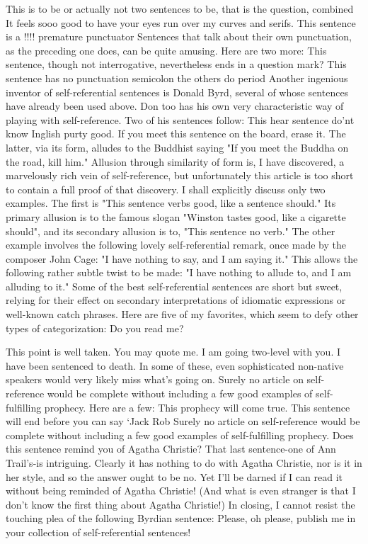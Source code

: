 This is to be or actually not two sentences to be, that is the question, combined 
It feels sooo good to have your eyes run over my curves and serifs. 
This sentence is a !!!! premature punctuator 
Sentences that talk about their own punctuation, as the preceding one does, can be quite amusing. Here are two more: 
This sentence, though not interrogative, nevertheless ends in a question mark? 
This sentence has no punctuation semicolon the others do period 
Another ingenious inventor of self-referential sentences is Donald Byrd, several of whose sentences have already been used above. Don too has his own very characteristic way of playing with self-reference. Two of his sentences follow: 
This hear sentence do'nt know Inglish purty good. 
If you meet this sentence on the board, erase it. 
The latter, via its form, alludes to the Buddhist saying "If you meet the Buddha on the road, kill him." Allusion through similarity of form is, I have discovered, a marvelously rich vein of self-reference, but unfortunately this article is too short to contain a full proof of that discovery. I shall explicitly discuss only two examples. The first is "This sentence verbs good, like a sentence should." Its primary allusion is to the famous slogan "Winston tastes good, like a cigarette should", and its secondary allusion is to, "This sentence no verb." The other example involves the following lovely self-referential remark, once made by the composer John Cage: "I have nothing to say, and I am saying it." This allows the following rather subtle twist to be made: "I have nothing to allude to, and I am alluding to it." 
\separator
Some of the best self-referential sentences are short but sweet, relying for their effect on secondary interpretations of idiomatic expressions or well-known catch phrases. Here are five of my favorites, which seem to defy other types of categorization: 
Do you read me? 



This point is well taken. 
You may quote me. 
I am going two-level with you. 
I have been sentenced to death. 
In some of these, even sophisticated non-native speakers would very likely miss what's going on. Surely no article on self-reference would be complete without including a few good examples of self-fulfilling prophecy. Here are a few: 
This prophecy will come true. 
This sentence will end before you can say `Jack Rob 
Surely no article on self-reference would be complete without including a few good examples of self-fulfilling prophecy. 
Does this sentence remind you of Agatha Christie? 
That last sentence-one of Ann Trail's-is intriguing. Clearly it has nothing to do with Agatha Christie, nor is it in her style, and so the answer ought to be no. Yet I'll be darned if I can read it without being reminded of Agatha Christie! (And what is even stranger is that I don't know the first thing about Agatha Christie!) In closing, I cannot resist the touching plea of the following Byrdian sentence: 
Please, oh please, publish me in your collection of self-referential sentences! 

